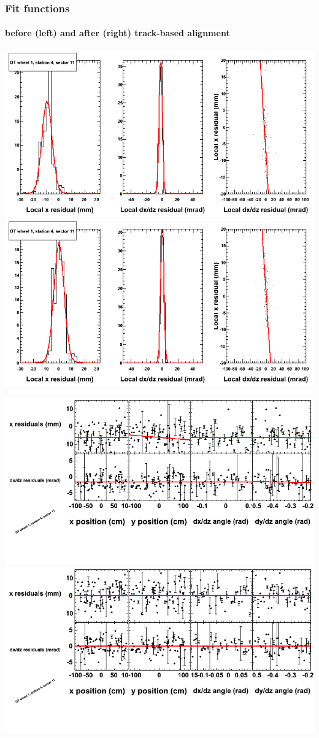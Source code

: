 \documentclass[compress]{beamer}
\begin{document}
\begin{frame}
\frametitle{Fit functions}
\framesubtitle{before (left) and after (right) track-based alignment}
\includegraphics[width=0.5\linewidth]{fitfunctions_re01/MBwhDst4sec11_bellcurves.png} \includegraphics[width=0.5\linewidth]{fitfunctions_re05/MBwhDst4sec11_bellcurves.png}

\includegraphics[width=0.5\linewidth]{fitfunctions_re01/MBwhDst4sec11_polynomials.png} \includegraphics[width=0.5\linewidth]{fitfunctions_re05/MBwhDst4sec11_polynomials.png}
\end{frame}
\end{document}

